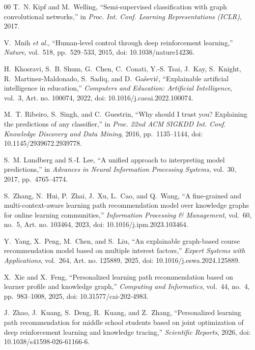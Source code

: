 \begin{thebibliography}{00}
T.~N. Kipf and M.~Welling, ``Semi-supervised classification with graph convolutional
networks,'' in \emph{Proc. Int. Conf. Learning Representations (ICLR)}, 2017.

V.~Mnih \emph{et al.}, ``Human-level control through deep reinforcement learning,''
\emph{Nature}, vol.~518, pp.~529--533, 2015, doi: 10.1038/nature14236.

H.~Khosravi, S.~B. Shum, G.~Chen, C.~Conati, Y.-S. Tsai, J.~Kay, S.~Knight,
R.~Martinez-Maldonado, S.~Sadiq, and D.~Ga\v{s}evi\'{c}, ``Explainable artificial
intelligence in education,'' \emph{Computers and Education: Artificial Intelligence},
vol.~3, Art. no. 100074, 2022, doi: 10.1016/j.caeai.2022.100074.

M.~T. Ribeiro, S.~Singh, and C.~Guestrin, ``Why should I trust you? Explaining the
predictions of any classifier,'' in \emph{Proc. 22nd ACM SIGKDD Int. Conf. Knowledge
Discovery and Data Mining}, 2016, pp.~1135--1144, doi: 10.1145/2939672.2939778.

S.~M. Lundberg and S.-I. Lee, ``A unified approach to interpreting model predictions,''
in \emph{Advances in Neural Information Processing Systems}, vol.~30, 2017,
pp.~4765--4774.

S.~Zhang, N.~Hui, P.~Zhai, J.~Xu, L.~Cao, and Q.~Wang, ``A fine-grained and
multi-context-aware learning path recommendation model over knowledge graphs for online
learning communities,'' \emph{Information Processing \& Management}, vol.~60, no.~5, Art.
no. 103464, 2023, doi: 10.1016/j.ipm.2023.103464.

Y.~Yang, X.~Peng, M.~Chen, and S.~Liu, ``An explainable graph-based course recommendation
model based on multiple interest factors,'' \emph{Expert Systems with Applications},
vol.~264, Art. no. 125889, 2025, doi: 10.1016/j.eswa.2024.125889.

X.~Xie and X.~Feng, ``Personalized learning path recommendation based on learner profile
and knowledge graph,'' \emph{Computing and Informatics}, vol.~44, no.~4, pp.~983--1008,
2025, doi: 10.31577/cai-202-4983.

J.~Zhao, J.~Kuang, S.~Deng, R.~Kuang, and Z.~Zhang, ``Personalized learning path
recommendation for middle school students based on joint optimization of deep
reinforcement learning and knowledge tracing,'' \emph{Scientific Reports}, 2026, doi:
10.1038/s41598-026-61166-6.


\end{thebibliography}
